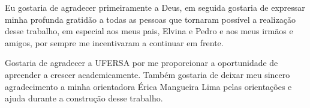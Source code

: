 \begin{agradecimentos}[AGRADECIMENTOS]

  Eu gostaria de agradecer primeiramente a Deus, em seguida gostaria de expressar minha profunda gratidão a todas as pessoas que tornaram possível a realização desse trabalho, em especial aos meus pais, Elvina e Pedro e aos meus irmãos e amigos, por sempre me incentivaram a continuar em frente.

  Gostaria de agradecer a UFERSA por me proporcionar a oportunidade de apreender a crescer academicamente. Também gostaria de deixar meu sincero agradecimento a minha orientadora Érica Mangueira Lima pelas orientações e ajuda durante a construção desse trabalho.
  
\end{agradecimentos}